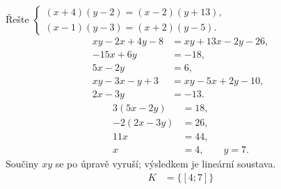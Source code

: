 \documentclass[11pt,a4paper]{article}
\begin{document}
\begin{zadaniReseniBox}[title={Samostatná práce 5}]
Řešte $\begin{cases}(x+4)(y-2)=(x-2)(y+13),\\(x-1)(y-3)=(x+2)(y-5).\end{cases}$
\tcblower
\[
\begin{aligned}
xy-2x+4y-8&=xy+13x-2y-26,\\
-15x+6y&=-18,\\
5x-2y&=6,\\[2pt]
xy-3x-y+3&=xy-5x+2y-10,\\
2x-3y&=-13.
\end{aligned}
\]
\[
\begin{aligned}
3(5x-2y)&=18,\\
-2(2x-3y)&=26,\\
11x&=44,\\
x&=4,\qquad y=7.
\end{aligned}
\]
Součiny $xy$ se po úpravě vyruší; výsledkem je lineární soustava.
\[
\begin{aligned}
K &= \{[4;7]\}
\end{aligned}
\]
\end{zadaniReseniBox}
\end{document}

